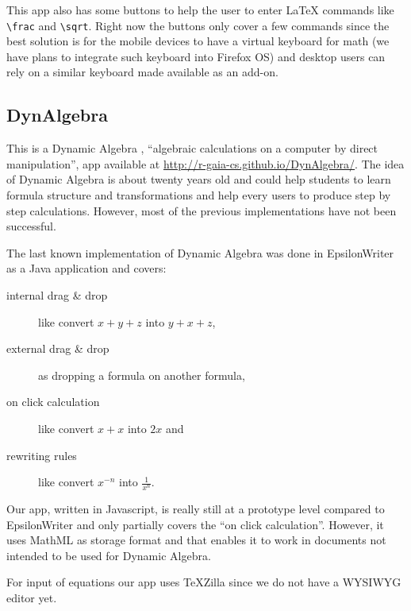 This app also has some buttons to help the user to enter LaTeX commands like
{\tt \textbackslash frac} and {\tt \textbackslash sqrt}. Right now the buttons
only cover a few commands since the best solution is for the mobile devices
to have a virtual keyboard for math (we have plans to integrate
such keyboard into Firefox OS) and desktop users can rely on a similar keyboard
made available as an add-on.

\subsection{DynAlgebra}

This is a Dynamic Algebra \cite{Nicaud1}, ``algebraic calculations
on a computer by direct manipulation'', app available at
\href{http://r-gaia-cs.github.io/DynAlgebra/}{http://r-gaia-cs.github.io/DynAlgebra/}.
The idea of Dynamic Algebra is about twenty years old and could help
students to learn formula structure and transformations and help every users to
produce step by step calculations. However, most of the previous implementations
have not been successful.

The last known implementation of Dynamic Algebra was done in EpsilonWriter
\cite{Nicaud2} as a Java application and covers:
\begin{description}
  \item[internal drag \& drop] like convert $x + y + z$ into $y + x + z$,
  \item[external drag \& drop] as dropping a formula on another formula,
  \item[on click calculation] like convert $x + x$ into $2 x$ and
  \item[rewriting rules] like convert $x^{-n}$ into $\frac{1}{x^n}$.
\end{description}

Our app, written in Javascript, is really still at a prototype level compared
to EpsilonWriter and only partially
covers the ``on click calculation''. However, it uses MathML as storage format
and that enables it to work in documents not intended to be used for Dynamic Algebra.

For input of equations our app uses TeXZilla since we do not have a WYSIWYG
editor yet.
